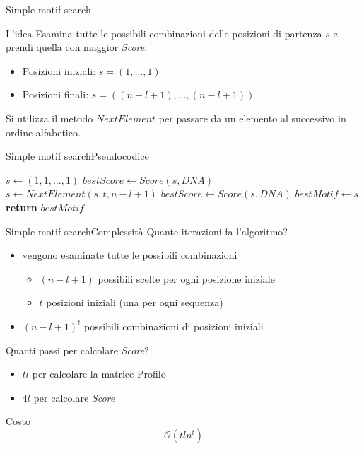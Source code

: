 	\begin{frame}{Simple motif search}
		\begin{block}{L'idea}
			Esamina tutte le possibili combinazioni delle posizioni di partenza $s$ e prendi quella con maggior \textit{Score}.
		\end{block}
		\begin{itemize}
			\item Posizioni iniziali: $s=(1,\dots,1)$
			\item Posizioni  finali: $s=((n-l+1),\dots,(n-l+1))$
		\end{itemize}
		Si utilizza il metodo $NextElement$ per passare da un elemento al successivo in ordine alfabetico.
	\end{frame}
	
	\begin{frame}{Simple motif search}{Pseudocodice}
		\begin{center}
		    \begin{algorithmic}[1]
				    \State $s\gets (1,1,\dots,1)$
				    \State $bestScore\gets Score(s,DNA)$
				    	\State $s\gets NextElement(s,t,n-l+1)$
				    		\State $bestScore\gets Score(s,DNA)$
				    		\State $bestMotif\gets s$
				    	\EndIf
				    		\State \textbf{return} $bestMotif$
				    	\EndIf
				    \EndWhile
			    \EndProcedure
		    \end{algorithmic}
	    \end{center}
	\end{frame}
	
	\begin{frame}{Simple motif search}{Complessità}
		Quante iterazioni fa l'algoritmo?
		\begin{itemize}
			\item vengono esaminate tutte le possibili combinazioni
			\begin{itemize}
				\item $(n-l+1)$ possibili scelte per ogni posizione iniziale
				\item $t$ posizioni iniziali (una per ogni sequenza)
			\end{itemize}
			\item $(n-l+1)^t$ possibili combinazioni di posizioni iniziali
		\end{itemize}
		Quanti passi per calcolare \textit{Score}?
		\begin{itemize}
			\item $tl$ per calcolare la matrice Profilo
			\item $4l$ per calcolare \textit{Score}
		\end{itemize}
		\begin{block}{Costo}
			$$\mathcal{O}(tln^t)$$
		\end{block}
	\end{frame}
	
